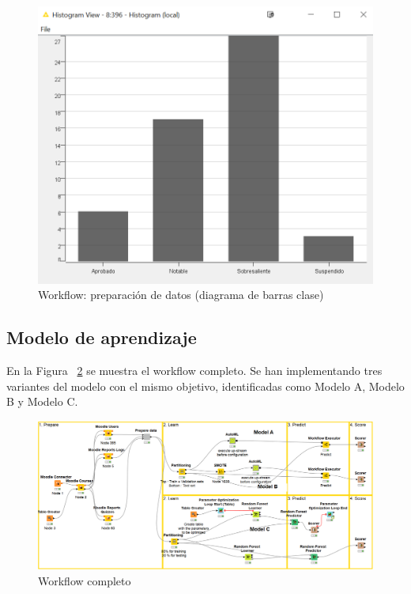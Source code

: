 \begin{figure}[!htb]
	\centering
	\includegraphics[width=1\textwidth]{img/workflow3.png}
	\caption{Workflow: preparación de datos (diagrama de barras clase)}
	\label{fig:workflow3}
\end{figure}
\FloatBarrier


\subsection{Modelo de aprendizaje}

En la Figura ~\ref{fig:workflow4} se muestra el workflow completo. Se han implementando tres variantes del modelo con el mismo 
objetivo, identificadas como Modelo A, Modelo B y Modelo C. 

\begin{figure}[!htb]
	\centering
	\includegraphics[width=1\textwidth]{img/workflow4.png}
	\caption{Workflow completo}
	\label{fig:workflow4}
\end{figure}
\FloatBarrier

